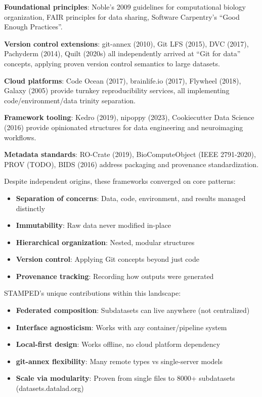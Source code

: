 \documentclass{article}
\begin{document}
\textbf{Foundational principles}: Noble's 2009 guidelines for computational biology organization\cite{noble_quick_2009}, FAIR principles for data sharing\cite{wilkinson_fair_2016}, Software Carpentry's ``Good Enough Practices''\cite{wilson_good_2017}.

\textbf{Version control extensions}: git-annex (2010), Git LFS (2015), DVC (2017), Pachyderm (2014), Quilt (2020s) all independently arrived at ``Git for data'' concepts, applying proven version control semantics to large datasets.

\textbf{Cloud platforms}: Code Ocean (2017), brainlife.io (2017), Flywheel (2018), Galaxy (2005) provide turnkey reproducibility services, all implementing code/environment/data trinity separation.

\textbf{Framework tooling}: Kedro (2019), nipoppy (2023), Cookiecutter Data Science (2016) provide opinionated structures for data engineering and neuroimaging workflows.

\textbf{Metadata standards}: RO-Crate (2019), BioComputeObject (IEEE 2791-2020), PROV (TODO), BIDS (2016) address packaging and provenance standardization.

Despite independent origins, these frameworks converged on core patterns:
\begin{itemize}
    \item \textbf{Separation of concerns}: Data, code, environment, and results managed distinctly
    \item \textbf{Immutability}: Raw data never modified in-place
    \item \textbf{Hierarchical organization}: Nested, modular structures
    \item \textbf{Version control}: Applying Git concepts beyond just code
    \item \textbf{Provenance tracking}: Recording how outputs were generated
\end{itemize}

STAMPED's unique contributions within this landscape:
\begin{itemize}
    \item \textbf{Federated composition}: Subdatasets can live anywhere (not centralized)
    \item \textbf{Interface agnosticism}: Works with any container/pipeline system
    \item \textbf{Local-first design}: Works offline, no cloud platform dependency
    \item \textbf{git-annex flexibility}: Many remote types vs single-server models
    \item \textbf{Scale via modularity}: Proven from single files to 8000+ subdatasets (datasets.datalad.org)
\end{itemize}
\end{document}
